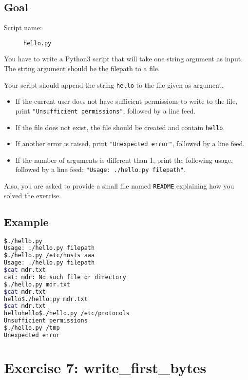 \documentclass[12pt]{article}
\begin{document}
\subsection{Goal}

\begin{description}
        \item[Script name:] \texttt{hello.py}
\end{description}

You have to write a Python3 script that will take one string argument as input. The string argument should be the filepath to a file.

Your script should append the string \texttt{hello} to the file given as argument.

\begin{itemize}
\item If the current user does not have sufficient permissions to write to the file, print \texttt{"Unsufficient permissions"}, followed by a line feed.

\item If the file does not exist, the file should be created and contain \texttt{hello}.

\item If another error is raised, print \texttt{"Unexpected error"}, followed by a line feed.

\item If the number of arguments is different than 1, print the following usage, followed by a line feed: \texttt{"Usage: ./hello.py filepath"}.
\end{itemize}

Also, you are asked to provide a small file named \texttt{README} explaining how you solved the exercise.

\subsection{Example}

\begin{lstlisting}[language=bash]
$./hello.py 
Usage: ./hello.py filepath
$./hello.py /etc/hosts aaa
Usage: ./hello.py filepath
$cat mdr.txt
cat: mdr: No such file or directory
$./hello.py mdr.txt
$cat mdr.txt
hello$./hello.py mdr.txt
$cat mdr.txt
hellohello$./hello.py /etc/protocols
Unsufficient permissions
$./hello.py /tmp
Unexpected error
\end{lstlisting}

\section{Exercise 7: write\_first\_bytes}
\end{document}
